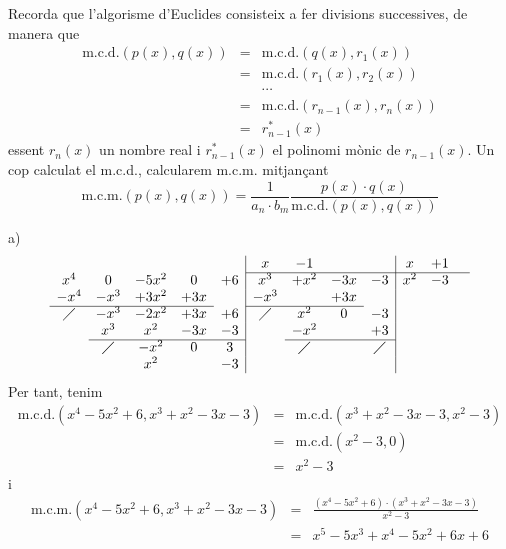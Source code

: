 \begin{solucio}
Recorda que l'algorisme d'Euclides consisteix a fer divisions successives, de manera que\begin{eqnarray*}
\text{m.c.d.}\left( p(x),q(x)\right) &=&\text{m.c.d.}\left(
q(x),r_{1}(x)\right) \\
&=&\text{m.c.d.}\left( r_{1}(x),r_{2}(x)\right) \\
&&\cdots \\
&=&\text{m.c.d.}\left( r_{n-1}(x),r_{n}(x)\right) \\
&=&r_{n-1}^{\ast }(x)
\end{eqnarray*}essent $r_{n}(x)$ un nombre real i $r_{n-1}^{\ast }(x)$ el polinomi mònic de $r_{n-1}(x)$. Un cop calculat el m.c.d., calcularem m.c.m.
mitjançant\[
\text{m.c.m.}\left( p(x),q(x)\right) =\frac{1}{a_{n}\cdot b_{m}}\frac{p(x)\cdot q(x)}{\text{m.c.d.}\left( p(x),q(x)\right) }
\]

a)
\[
\begin{array}{ccccc|cccc|ccc}
& & & & & x & -1 & & & x & +1 & \\ \cline{6-12}
x^{4} & 0 & -5x^{2} & 0 & +6 & x^{3} & +x^{2} & -3x & -3 & x^{2} & -3 & \\
-x^{4} & -x^{3} & +3x^{2} & +3x & & -x^{3} & & +3x & & & & \\
\cline{1-4}\cline{6-8}
\diagup & -x^{3} & -2x^{2} & +3x & +6 & \diagup & x^{2} & 0 & -3 & & & \\
& x^{3} & x^{2} & -3x & -3 & & -x^{2} & & +3 & & & \\
\cline{2-5}\cline{7-9}
& \diagup & -x^{2} & 0 & 3 & & \diagup & & \diagup & & & \\
& & x^{2} & & -3 & & & & & & &
\end{array}\]Per tant, tenim\begin{eqnarray*}
\text{m.c.d.}\left( x^{4}-5x^{2}+6,x^{3}+x^{2}-3x-3\right) &=&\text{m.c.d.}\left( x^{3}+x^{2}-3x-3,x^{2}-3\right) \\
&=&\text{m.c.d.}\left( x^{2}-3,0\right) \\
&=&x^{2}-3
\end{eqnarray*}i\begin{eqnarray*}
\text{m.c.m.}\left( x^{4}-5x^{2}+6,x^{3}+x^{2}-3x-3\right) &=&\frac{\left(
x^{4}-5x^{2}+6\right) \cdot \left( x^{3}+x^{2}-3x-3\right) }{x^{2}-3} \\
&=&x^{5}-5x^{3}+x^{4}-5x^{2}+6x+6
\end{eqnarray*}


\end{solucio}
